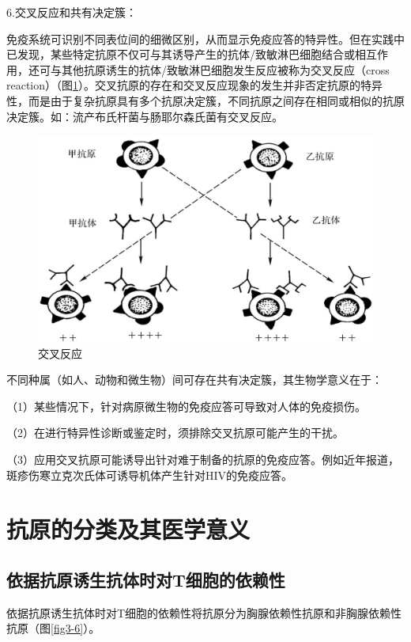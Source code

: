 6.交叉反应和共有决定簇：

免疫系统可识别不同表位间的细微区别，从而显示免疫应答的特异性。但在实践中已发现，某些特定抗原不仅可与其诱导产生的抗体/致敏淋巴细胞结合或相互作用，还可与其他抗原诱生的抗体/致敏淋巴细胞发生反应被称为交叉反应（cross
reaction）（图\ref{fig3-5}）。交叉抗原的存在和交叉反应现象的发生并非否定抗原的特异性，而是由于复杂抗原具有多个抗原决定簇，不同抗原之间存在相同或相似的抗原决定簇。如：流产布氏杆菌与肠耶尔森氏菌有交叉反应。

\begin{figure}[!htbp]
 \centering
 \includegraphics{./images/Image00054.jpg}
 \captionsetup{justification=centering}
 \caption{交叉反应}
 \label{fig3-5}
  \end{figure}

不同种属（如人、动物和微生物）间可存在共有决定簇，其生物学意义在于：

（1）某些情况下，针对病原微生物的免疫应答可导致对人体的免疫损伤。

（2）在进行特异性诊断或鉴定时，须排除交叉抗原可能产生的干扰。

（3）应用交叉抗原可能诱导出针对难于制备的抗原的免疫应答。例如近年报道，斑疹伤寒立克次氏体可诱导机体产生针对HIV的免疫应答。

\section{抗原的分类及其医学意义}


\subsection{依据抗原诱生抗体时对T细胞的依赖性}

依据抗原诱生抗体时对T细胞的依赖性将抗原分为胸腺依赖性抗原和非胸腺依赖性抗原（图\ref{fig3-6}）。

